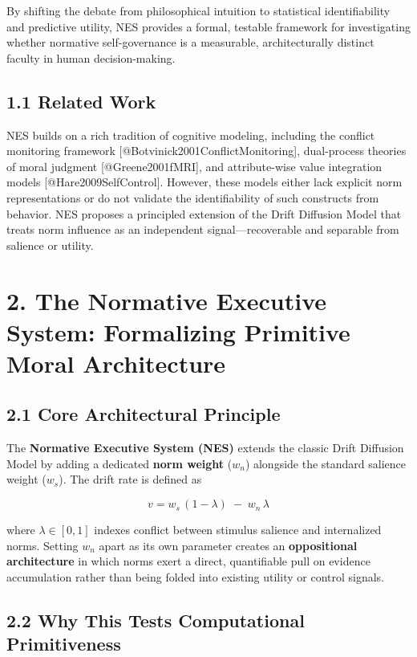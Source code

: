 \documentclass[
  11pt,
]{article}
\begin{document}
By shifting the debate from philosophical intuition to statistical
identifiability and predictive utility, NES provides a formal, testable
framework for investigating whether normative self-governance is a
measurable, architecturally distinct faculty in human decision-making.

\subsection{1.1 Related Work}\label{related-work}

NES builds on a rich tradition of cognitive modeling, including the
conflict monitoring framework {[}@Botvinick2001ConflictMonitoring{]},
dual-process theories of moral judgment {[}@Greene2001fMRI{]}, and
attribute-wise value integration models {[}@Hare2009SelfControl{]}.
However, these models either lack explicit norm representations or do
not validate the identifiability of such constructs from behavior. NES
proposes a principled extension of the Drift Diffusion Model that treats
norm influence as an independent signal---recoverable and separable from
salience or utility.

\section{2. The Normative Executive System: Formalizing Primitive Moral
Architecture}\label{the-normative-executive-system-formalizing-primitive-moral-architecture}

\subsection{2.1 Core Architectural
Principle}\label{core-architectural-principle}

The \textbf{Normative Executive System (NES)} extends the classic Drift
Diffusion Model by adding a dedicated \textbf{norm weight} (\(w_n\))
alongside the standard salience weight (\(w_s\)). The drift rate is
defined as

\[
v = w_s\,(1 - \lambda)\;-\;w_n\,\lambda
\]

where \(\lambda\in[0,1]\) indexes conflict between stimulus salience and
internalized norms. Setting \(w_n\) apart as its own parameter creates
an \textbf{oppositional architecture} in which norms exert a direct,
quantifiable pull on evidence accumulation rather than being folded into
existing utility or control signals.

\subsection{2.2 Why This Tests Computational
Primitiveness}\label{why-this-tests-computational-primitiveness}
\end{document}
